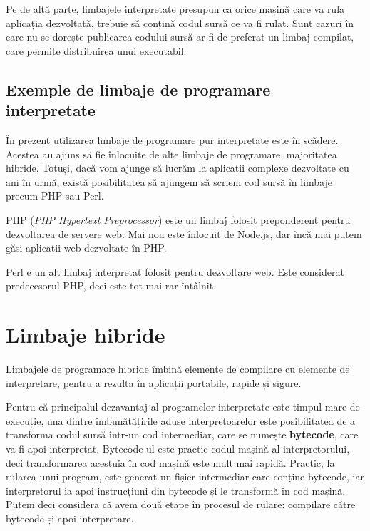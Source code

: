 Pe de altă parte, limbajele interpretate presupun ca orice mașină care va rula aplicația dezvoltată, trebuie să conțină codul sursă ce va fi rulat.
Sunt cazuri în care nu se dorește publicarea codului sursă ar fi de preferat un limbaj compilat, care permite distribuirea unui executabil.

\subsection{Exemple de limbaje de programare interpretate}
\label{sec:appdev:interpreted-lang:ex}

În prezent utilizarea limbaje de programare pur interpretate este în scădere.
Acestea au ajuns să fie înlocuite de alte limbaje de programare, majoritatea hibride.
Totuși, dacă vom ajunge să lucrăm la aplicații complexe dezvoltate cu ani în urmă, există posibilitatea să ajungem să scriem cod sursă în limbaje precum PHP sau Perl.

PHP  (\textit{PHP Hypertext Preprocessor}) este un limbaj folosit preponderent pentru dezvoltarea de servere web.
Mai nou este înlocuit de Node.js, dar încă mai putem găsi aplicații web dezvoltate în PHP.

Perl e un alt limbaj interpretat folosit pentru dezvoltare web.
Este considerat predecesorul PHP, deci este tot mai rar întâlnit.

\section{Limbaje hibride}
\label{sec:appdev:hybrid-lang}

Limbajele de programare hibride îmbină elemente de compilare cu elemente de interpretare, pentru a rezulta în aplicații portabile, rapide și sigure.

Pentru că principalul dezavantaj al programelor interpretate este timpul mare de execuție, una dintre îmbunătățirile aduse interpretoarelor este posibilitatea de a transforma codul sursă într-un cod intermediar, care se numește \textbf{bytecode}, care va fi apoi interpretat.
Bytecode-ul este practic codul mașină al interpretorului, deci transformarea acestuia în cod mașină este mult mai rapidă.
Practic, la rularea unui program, este generat un fișier intermediar care conține bytecode, iar interpretorul ia apoi instrucțiuni din bytecode și le transformă în cod mașină.
Putem deci considera că avem două etape în procesul de rulare: compilare către bytecode și apoi interpretare.

